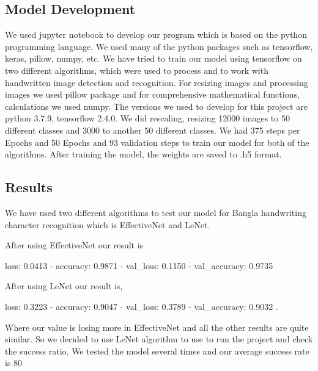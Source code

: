 \documentclass{article}
\begin{document}
\subsection{Model Development}
We used jupyter notebook to develop our program which is based on the python programming language. We used many of the python packages such as tensorflow, keras, pillow, numpy, etc. We have tried to train our model using tensorflow on two different algorithms, which were used to process and to work with handwritten image detection and recognition. For resizing images and processing images we used pillow package and for comprehensive mathematical functions, calculations we used numpy. The versions we used to develop for this project are python 3.7.9, tensorflow 2.4.0. We did rescaling, resizing 12000 images to 50 different classes and 3000 to another 50 different classes. We had 375 steps per Epochs and 50 Epochs and 93 validation steps to train our model for both of the algorithms. After training the model, the weights are saved to .h5 format.
\subsection{Results}
We have used two different algorithms to test our model for Bangla handwriting character recognition which is EffectiveNet and LeNet. 
    
    After using EffectiveNet our result is
    
loss: 0.0413 - accuracy: 0.9871 - val_loss: 0.1150 - val_accuracy: 0.9735

    After using LeNet our result is,
    
loss: 0.3223 - accuracy: 0.9047 - val_loss: 0.3789 - val_accuracy: 0.9032 .

Where our value is losing more in EffectiveNet and all the other results are quite similar. So we decided to use LeNet algorithm to use to run the project and check the success ratio. We tested the model several times and our average success rate is 80%
\end{document}
